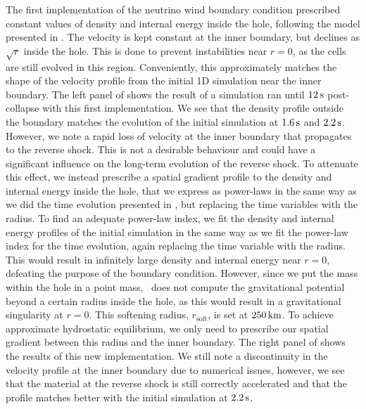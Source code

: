 The first implementation of the neutrino wind boundary condition prescribed constant values of density and internal energy inside the hole, following the model presented in . The velocity is kept constant at the inner boundary, but declines as \(\sqrt{r}\) inside the hole. This is done to prevent instabilities near \(r=0\), as the cells are still evolved in this region. Conveniently, this approximately matches the shape of the velocity profile from the initial 1D simulation near the inner boundary. The left panel of  shows the result of a simulation ran until \(12\,\mathrm{s}\) post-collapse with this first implementation. We see that the density profile outside the boundary matches the evolution of the initial simulation at \(1.6\,\mathrm{s}\) and \(2.2\,\mathrm{s}\). However, we note a rapid loss of velocity at the inner boundary that propagates to the reverse shock. This is not a desirable behaviour and could have a significant influence on the long-term evolution of the reverse shock. To attenuate this effect, we instead prescribe a spatial gradient profile to the density and internal energy inside the hole, that we express as power-laws in the same way as we did the time evolution presented in , but replacing the time variables with the radius. To find an adequate power-law index, we fit the density and internal energy profiles of the initial simulation in the same way as we fit the power-law index for the time evolution, again replacing the time variable with the radius. This would result in infinitely large density and internal energy near \(r=0\), defeating the purpose of the boundary condition. However, since we put the mass within the hole in a point mass, \flash\ does not compute the gravitational potential beyond a certain radius inside the hole, as this would result in a gravitational singularity at \(r=0\). This softening radius, \(r_\mathrm{soft}\), is set at \(250\,\mathrm{km}\). To achieve approximate hydrostatic equilibrium, we only need to prescribe our spatial gradient between this radius and the inner boundary. The right panel of  shows the results of this new implementation. We still note a discontinuity in the velocity profile at the inner boundary due to numerical issues, however, we see that the material at the reverse shock is still correctly accelerated and that the profile matches better with the initial simulation at \(2.2\,\mathrm{s}\).

